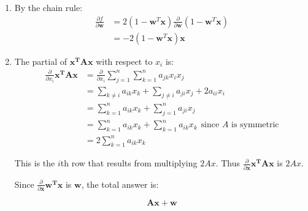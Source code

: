 \documentclass{harvardml}
\theoremstyle{definition}
\theoremstyle{plain}
\begin{document}
\begin{problem}
\begin{enumerate} [label=(\alph*)]
		        \item By the chain rule: \begin{align*}
		            \frac{\partial f}{\partial \mathbf{w}} &= 2(1-\mathbf{w}^T\mathbf{x}) \frac{\partial}{\partial \mathbf{w}} (1-\mathbf{w}^T\mathbf{x}) \\
		            &= -2(1-\mathbf{w}^T\mathbf{x})\mathbf{x}
		        \end{align*}
		        
		        \item The partial of $\mathbf{x^TAx}$ with respect to $x_i$ is: \begin{align*}
		            \frac{\partial}{\partial x_i} \mathbf{x^TAx} &= \frac{\partial}{\partial x_i} \sum_{j=1}^n \sum_{k=1}^n a_{jk} x_i x_j \\
		            &= \sum_{k\neq i}a_{ik} x_k +  \sum_{j\neq i}a_{ji}x_j + 2a_{ii}x_i \\ 
		            &= \sum_{k=1}^n a_{ik} x_k + \sum_{j=1}^n a_{ji} x_j \\
		            &= \sum_{k=1}^n a_{ik} x_k + \sum_{k=1}^n a_{ik} x_k \hspace{5pt} \text{since $A$ is symmetric}\\
		            &= 2\sum_{k=1}^n a_{ik} x_k
		        \end{align*}
		        
		        This is the $i$th row that results from multiplying $2Ax$. Thus $\frac{\partial}{\partial \mathbf{x}} \mathbf{x^TAx}$ is $2Ax$.
		        
		        Since $\frac{\partial}{\partial \mathbf{x}}\mathbf{w^Tx}$ is $\mathbf{w}$, the total answer is:
		        
		        \begin{equation}
		            \mathbf{A}\mathbf{x} + \mathbf{w}
		        \end{equation}
		       
		    \end{enumerate}
 		    
		\end{problem}
\end{document}
